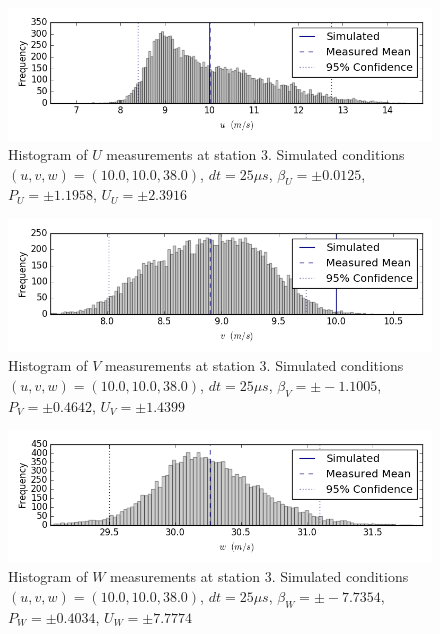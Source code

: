 \begin{figure}[H]
\centering
\includegraphics[width=6in]{figs/Ely_May28th03004/uncertainty_Ely_May28th03004_U}
\caption{Histogram of $U$ measurements at station 3. Simulated conditions $(u,v,w)=(10.0, 10.0, 38.0)$, $dt=25 \mu s$, $\beta_U=\pm 0.0125$, $P_U=\pm 1.1958$, $U_U=\pm 2.3916$}
\label{fig:uncertainty_Ely_May28th03004_U}
\end{figure}


\begin{figure}[H]
\centering
\includegraphics[width=6in]{figs/Ely_May28th03004/uncertainty_Ely_May28th03004_V}
\caption{Histogram of $V$ measurements at station 3. Simulated conditions $(u,v,w)=(10.0, 10.0, 38.0)$, $dt=25 \mu s$, $\beta_V=\pm -1.1005$, $P_V=\pm 0.4642$, $U_V=\pm 1.4399$}
\label{fig:uncertainty_Ely_May28th03004_V}
\end{figure}


\begin{figure}[H]
\centering
\includegraphics[width=6in]{figs/Ely_May28th03004/uncertainty_Ely_May28th03004_W}
\caption{Histogram of $W$ measurements at station 3. Simulated conditions $(u,v,w)=(10.0, 10.0, 38.0)$, $dt=25 \mu s$, $\beta_W=\pm -7.7354$, $P_W=\pm 0.4034$, $U_W=\pm 7.7774$}
\label{fig:uncertainty_Ely_May28th03004_W}
\end{figure}


